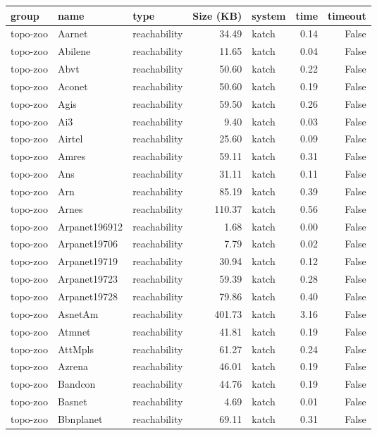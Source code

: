 \begin{tabular}{lllrlrr}
\toprule
group & name & type & Size (KB) & system & time & timeout \\
\midrule
topo-zoo & Aarnet & reachability & 34.49 & katch & 0.14 & False \\
topo-zoo & Abilene & reachability & 11.65 & katch & 0.04 & False \\
topo-zoo & Abvt & reachability & 50.60 & katch & 0.22 & False \\
topo-zoo & Aconet & reachability & 50.60 & katch & 0.19 & False \\
topo-zoo & Agis & reachability & 59.50 & katch & 0.26 & False \\
topo-zoo & Ai3 & reachability & 9.40 & katch & 0.03 & False \\
topo-zoo & Airtel & reachability & 25.60 & katch & 0.09 & False \\
topo-zoo & Amres & reachability & 59.11 & katch & 0.31 & False \\
topo-zoo & Ans & reachability & 31.11 & katch & 0.11 & False \\
topo-zoo & Arn & reachability & 85.19 & katch & 0.39 & False \\
topo-zoo & Arnes & reachability & 110.37 & katch & 0.56 & False \\
topo-zoo & Arpanet196912 & reachability & 1.68 & katch & 0.00 & False \\
topo-zoo & Arpanet19706 & reachability & 7.79 & katch & 0.02 & False \\
topo-zoo & Arpanet19719 & reachability & 30.94 & katch & 0.12 & False \\
topo-zoo & Arpanet19723 & reachability & 59.39 & katch & 0.28 & False \\
topo-zoo & Arpanet19728 & reachability & 79.86 & katch & 0.40 & False \\
topo-zoo & AsnetAm & reachability & 401.73 & katch & 3.16 & False \\
topo-zoo & Atmnet & reachability & 41.81 & katch & 0.19 & False \\
topo-zoo & AttMpls & reachability & 61.27 & katch & 0.24 & False \\
topo-zoo & Azrena & reachability & 46.01 & katch & 0.19 & False \\
topo-zoo & Bandcon & reachability & 44.76 & katch & 0.19 & False \\
topo-zoo & Basnet & reachability & 4.69 & katch & 0.01 & False \\
topo-zoo & Bbnplanet & reachability & 69.11 & katch & 0.31 & False \\

\end{tabular}
